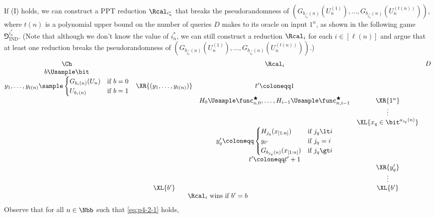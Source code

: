 \begin{answer}[b]
    If (I) holds, we can construct a PPT reduction $\Rcal_{i^\ast_n}$ that breaks the pseudorandomness of $(G_{b_{i^\ast_n}(n)}(U_n^{(1)}),\ldots, G_{b_{i^\ast_n}(n)}(U_n^{(t(n))}))$, where $t(n)$ is a polynomial upper bound on the number of queries $D$ makes to its oracle on input $1^n$, as shown in the following game $\Game^{i^\ast_n}_{\textrm{IND}}$. (Note that although we don't know the value of $i^\ast_n$, we can still construct a reduction $\Rcal_i$ for each $i\in [\ell(n)]$ and argue that at least one reduction breaks the pseudorandomness of $(G_{b_{i^\ast_n}(n)}(U_n^{(1)}),\ldots, G_{b_{i^\ast_n}(n)}(U_n^{(t(n))}))$.)
    {
        \[
            \begin{array}{@{} c c c c c@{}}
            \Ch & & \Rcal_i & & D \\
            b\Usample\bit & &  & & \\
            y_1,\ldots,y_{t(n)} \sample \begin{cases}
                G_{b_{i}(n)}(U_n) &\textrm{if } b=0\\
                U_{b_{i}(n)} &\textrm{if } b=1
            \end{cases} & \XR{(y_1,\ldots,y_{t(n)})} & t' \coloneqq 1 & & \\
            &  & H_0\Usample\func_{n,0}^\bigstar,\ldots,H_{i-1}\Usample\func_{n,i-1}^\bigstar  & \XR{1^n} & \\
            & & & \vdots & \\
            & & & \XL{x_q\in\bit^{a_{j_q}(n)}} & \\
            & & y_q' \coloneqq \begin{cases}
               H_{j_q}(x_{[1:n]}) &\textrm{if } j_q\lt i\\
               y_{t'} &\textrm{if } j_q=i\\
               G_{b_{j_q}(n)}(x_{[1:n]}) &\textrm{if } j_q\gt i
            \end{cases}& & \\
            & & t'\coloneqq t'+1 & & \\
            & & & \XR{y_q'} & \\
            & & & \vdots & \\
            & \XL{b'} & & \XL{b'} & \\
            \multicolumn{5}{c}{\text{$\Rcal_i$ wins if $b' = b$}}
            \end{array}
        \]
        \label{fig:p4-game2}
    }
    Observe that for all $n\in\Nbb$ such that \eqref{eq:p4-2-1} holds,

\end{answer}

